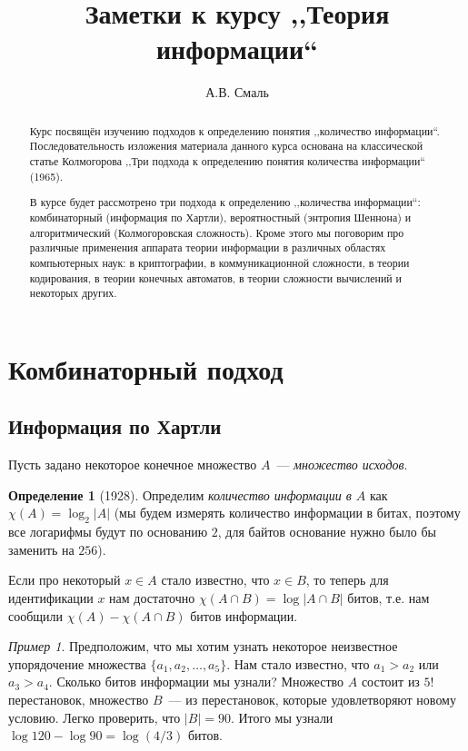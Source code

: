 \documentclass[12pt]{article}
\title{Заметки к курсу ,,Теория информации``}
\author{А.В. Смаль}
\newcommand{\seqn}[2]{{#1}_1,{#1}_2,\dotsc,{#1}_{#2}}
\theoremstyle{definition}
\newtheorem{definition}{Определение}[section]
\theoremstyle{plain}
\theoremstyle{remark}
\newtheorem{example}{Пример}[section]
\begin{document}
\maketitle

\begin{abstract}
Курс посвящён изучению подходов к определению понятия  ,,количество информации``. 
Последовательность изложения материала данного курса основана на классической статье Колмогорова ,,Три подхода к
определению понятия количества информации`` (1965).

В курсе будет рассмотрено три подхода к определению ,,количества информации``: 
комбинаторный (информация по Хартли), вероятностный (энтропия Шеннона) и 
алгоритмический (Колмогоровская сложность). Кроме этого мы поговорим про
различные применения аппарата теории информации в различных областях компьютерных наук:
в криптографии, в коммуникационной сложности, в теории кодирования, 
в теории конечных автоматов, в теории сложности вычислений и некоторых других.
\end{abstract}

\newpage\tableofcontents\newpage

\section{Комбинаторный подход}
\subsection{Информация по Хартли}
Пусть задано некоторое конечное множество \(A\)~--- \emph{множество исходов}.
\begin{definition}[1928]
Определим \emph{количество информации в \(A\)} как \(\chi(A) = \log_2|A|\) (мы будем измерять количество информации в битах, поэтому все логарифмы будут по основанию \(2\), для байтов основание нужно было бы заменить на \(256\)).
\end{definition}

Если про некоторый \(x\in A\) стало известно, что \(x\in B\), то теперь для идентификации \(x\) нам достаточно \(\chi(A\cap B) = \log |A\cap B|\) битов, т.е. нам сообщили \(\chi(A) - \chi(A\cap B)\) битов информации.

\begin{example}
    Предположим, что мы хотим узнать некоторое неизвестное упорядочение множества $\{\seqn{a}{5}\}$. Нам стало известно,
    что \(a_1>a_2\) или \(a_3>a_4\). Сколько битов информации мы узнали? Множество \(A\) состоит из \(5!\) перестановок,
    множество \(B\)~--- из перестановок, которые удовлетворяют новому условию. Легко проверить, что \(|B| = 90\). Итого
    мы узнали \(\log 120 - \log 90 = \log(4/3)\) битов.
\end{example}
\end{document}
